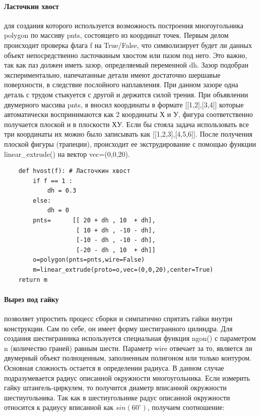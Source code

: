 \paragraph{Ласточкин хвост} для создания которого используется возможность построения многоугольника polygon по массиву pnts, состоящего из координат точек. Первым делом происходит проверка флага f на True/False, что символизирует будет ли данных объект непосредственно ласточкиным хвостом или пазом под него. Это важно, так как паз должен иметь зазор, определяемый переменной dh. Зазор подобран экспериментально, напечатанные детали имеют достаточно шершавые поверхности, в следствие послойного наплавления. При данном зазоре одна деталь с трудом стыкуется с другой и держится силой трения. При объявлении двумерного массива pnts, я вносил координаты в формате [[1,2],[3,4]] которые автоматически воспринимаются как 2 координаты Х и У, фигура соответственно получается плоской и в плоскости ХУ. Если бы стояла задача использовать все три координаты их можно было записывать как [[1,2,3],[4,5,6]]. После получения плоской фигуры (трапеции), происходит ее экструдирование с помощью функции linear\_extrude() на вектор vec=(0,0,20).         

\begin{verbatim}
    def hvost(f): # Ласточкин хвост
        if f == 1 :
            dh = 0.3
        else:
            dh = 0
        pnts=      [[ 20 + dh , 10  + dh],
                    [ 10 + dh , -10 - dh],
                    [-10 - dh , -10 - dh],
                    [-20 - dh , 10  + dh]]
        o=polygon(pnts=pnts,wire=False)
        m=linear_extrude(proto=o,vec=(0,0,20),center=True)
    return m
\end{verbatim}

\paragraph{Вырез под гайку} позволяет упростить процесс сборки и симпатично спрятать гайки внутри конструкции. Сам по себе, он имеет форму шестигранного цилиндра. Для создания шестигранника используется специальная функция ngon() с параметром n (количество граней) равным шести. Параметр wire отвечает за то, является ли двумерный объект полноценным, заполненным полигоном или только контуром. Основная сложность остается в определении радиуса. В данном случае подразумевается радиус описанной окружности многоугольника. Если измерить гайку штангель-циркулем, то получится диаметр вписанной окружности шестиугольника. Так как в шестиугольнике радус описанной окружности относится к радиусу вписанной как $sin(60^{\circ})$, получаем соотношение:

